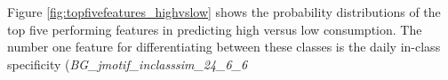 Figure \ref{fig:topfivefeatures_highvslow} shows the probability distributions of the top five performing features in predicting high versus low consumption. The number one feature for differentiating between these classes is the daily in-class specificity (\emph{BG_jmotif_inclasssim_24_6_6}